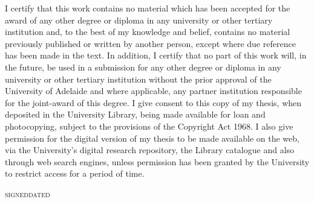 \documentclass[11pt,a4paper]{memoir}
\begin{document}
{\centering\begin{minipage}{0.89\textwidth}
\nonfrenchspacing
\parfillskip=0pt
I certify that this work contains no material which has been accepted for the award of any other degree or diploma in any university or other tertiary institution and, to the best of my knowledge and belief, contains no material previously published or written by another person, except where due reference has been made in the text. In addition, I certify that no part of this work will, in the future, be used in a submission for any other degree or diploma in any university or other tertiary institution without the prior approval of the University of Adelaide and where applicable, any partner institution responsible for the joint-award of this degree.
\PPP
I give consent to this copy of my thesis, when deposited in the University Library, being made available for loan and photocopying, subject to the provisions of the Copyright Act 1968.
\PPP
I also give permission for the digital version of my thesis to be made available on the web, via the University’s digital research repository, the Library catalogue and also through web search engines, unless permission has been granted by the University to restrict access for a period of time.
\par

\vspace*{1cm}

\hrulefill\hrulefill\hrulefill\hfill\hrulefill\hrulefill

\noindent\small\textsc{signed}\hfill\textsc{dated}

\end{minipage}\par}
\end{document}
